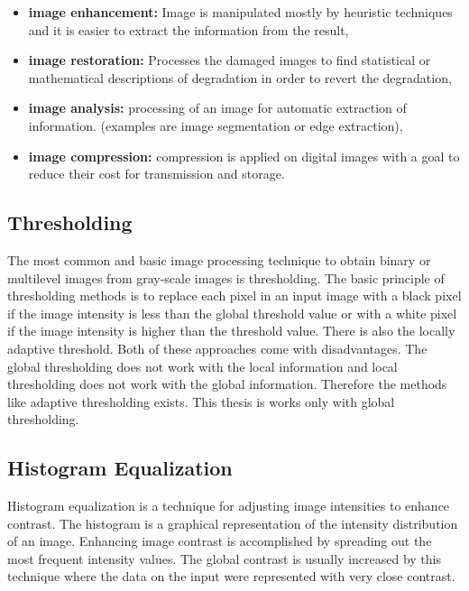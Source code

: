 \begin{itemize}
	\item \textbf{image enhancement:} Image is manipulated mostly by heuristic techniques and it is easier to extract the information from the result,
	\item \textbf{image restoration:} Processes the damaged images to find statistical or mathematical descriptions of degradation in order to revert the degradation,
	\item \textbf{image analysis:} processing of an image for automatic extraction of information. (examples are image segmentation or edge extraction),
	\item \textbf{image compression:} compression is applied on digital images with a goal to reduce their cost for transmission and storage.
\end{itemize}

\subsection{Thresholding}
The most common and basic image processing technique to obtain binary or multilevel images from gray-scale images is thresholding. The basic principle of thresholding methods is to replace each pixel in an input image with a black pixel if the image intensity is less than the global threshold value or with a white pixel if the image intensity is higher than the threshold value. There is also the locally adaptive threshold. Both of these approaches come with disadvantages. The global thresholding does not work with the local information and local thresholding does not work with the global information. \cite{thresholding_1} Therefore the methods like adaptive thresholding exists. \cite{thresholding_2} \cite{binarization} This thesis is works only with global thresholding.


\subsection{Histogram Equalization}
Histogram equalization is a technique for adjusting image intensities to enhance contrast. The histogram is a graphical representation of the intensity distribution of an image. Enhancing image contrast is accomplished by spreading out the most frequent intensity values. The global contrast is usually increased by this technique where the data on the input were represented with very close contrast. \cite{histogram}

